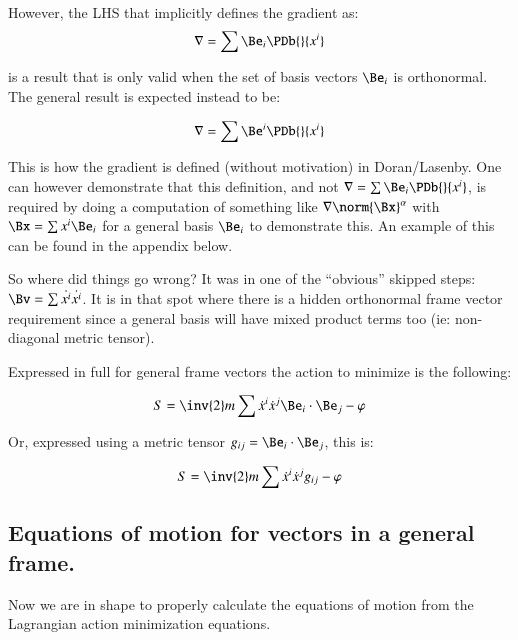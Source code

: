 However, the LHS that implicitly defines the gradient as:
\begin{equation*}
\grad = \sum \Be_i \PDb{}{x^i}
\end{equation*}

is a result that is only valid when the set of basis vectors $\Be_i$ is orthonormal.  The general result is
expected instead to be:

\begin{equation*}
\grad = \sum \Be^i \PDb{}{x^i}
\end{equation*}

This is how the gradient is defined (without motivation) in Doran/Lasenby.  One can however demonstrate that this definition, and not $\grad = \sum \Be_i \PDb{}{x^i}$, is required by doing a computation of something like $\grad \norm{\Bx}^\alpha$ with $\Bx = \sum x^i \Be_i$ for a general basis $\Be_i$ to demonstrate this.  An example of this can be found in the appendix below.

So where did things go wrong?  It was in one of the ``obvious'' skipped steps: $\Bv = \sum \dot{x^i} \dot{x^i}$.  It is in that
spot where there is a hidden orthonormal frame vector requirement since a general basis will have mixed product terms too
(ie: non-diagonal metric tensor).

Expressed in full for general frame vectors the action to minimize is the following:

\begin{equation}
S = \inv{2} m \sum \dot{x}^i \dot{x}^j \Be_i \cdot \Be_j -\varphi
\end{equation}

Or, expressed using a metric tensor $g_{ij} = \Be_i \cdot \Be_j$, this is:

\begin{equation}
S = \inv{2} m \sum \dot{x}^i \dot{x}^j g_{ij} -\varphi
\end{equation}

\subsection{Equations of motion for vectors in a general frame. }

Now we are in shape to properly calculate the equations of motion from the Lagrangian action minimization equations.

